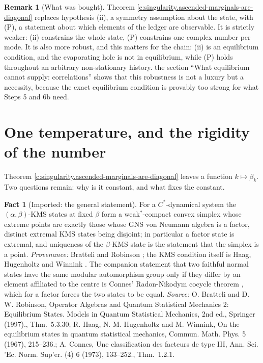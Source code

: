 \documentclass[11pt]{article}
\theoremstyle{definition}
\newtheorem{fact}[theorem]{Fact}
\newtheorem{remark}[theorem]{Remark}
\theoremstyle{plain}
\begin{document}
\begin{remark}[What was bought]\label{c:note.state-selection.what-was-bought}
Theorem \ref{c:singularity.ascended-marginals-are-diagonal} replaces hypothesis (ii), a symmetry assumption about the state, with (P), a statement about which elements of the ledger are observable. It is strictly weaker: (ii) constrains the whole state, (P) constrains one complex number per mode. It is also more robust, and this matters for the chain: (ii) is an equilibrium condition, and the evaporating hole is not in equilibrium, while (P) holds throughout an arbitrary non-stationary history. the section ``What equilibrium cannot supply: correlations'' shows that this robustness is not a luxury but a necessity, because the exact equilibrium condition is provably too strong for what Steps 5 and 6b need.
\end{remark}

\section{One temperature, and the rigidity of the number}

\label{c:note.state-selection.setting-one-temperature-rigidity-number}
Theorem \ref{c:singularity.ascended-marginals-are-diagonal} leaves a function $k \mapsto \beta_k$. Two questions remain: why is it constant, and what fixes the constant.

\begin{fact}[Imported: the general statement]\label{c:state-selection.imported-general-statement}
For a $C^{*}$-dynamical system the $(\alpha,\beta)$-KMS states at fixed $\beta$ form a weak$^{*}$-compact convex simplex whose extreme points are exactly those whose GNS von Neumann algebra is a factor, distinct extremal KMS states being disjoint; in particular a factor state is extremal, and uniqueness of the $\beta$-KMS state is the statement that the simplex is a point. \emph{Provenance:} Bratteli and Robinson \cite[Thm.~5.3.30]{BR2}; the KMS condition itself is Haag, Hugenholtz and Winnink \cite{HHW1967}. The companion statement that two faithful normal states have the same modular automorphism group only if they differ by an element affiliated to the centre is Connes' Radon-Nikodym cocycle theorem \cite[Thm.~1.2.1]{Connes1973}, which for a factor forces the two states to be equal.
\emph{Source:} O. Bratteli and D. W. Robinson, Operator Algebras and Quantum Statistical Mechanics 2: Equilibrium States. Models in Quantum Statistical Mechanics, 2nd ed., Springer (1997)., Thm.~5.3.30; R. Haag, N. M. Hugenholtz and M. Winnink, On the equilibrium states in quantum statistical mechanics, Commun. Math. Phys. 5 (1967), 215--236.; A. Connes, Une classification des facteurs de type III, Ann. Sci. 'Ec. Norm. Sup'er. (4) 6 (1973), 133--252., Thm.~1.2.1.
\end{fact}
\end{document}
